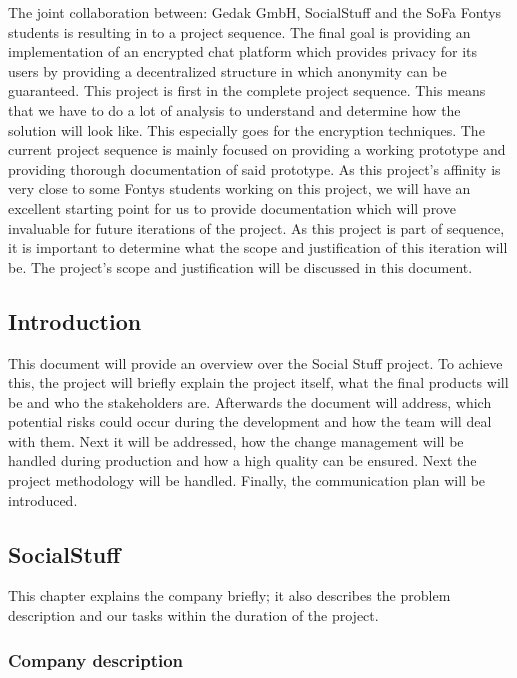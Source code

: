 The joint collaboration between: Gedak GmbH, SocialStuff and the SoFa Fontys students is resulting in to a project
sequence.
The final goal is providing an implementation of an encrypted chat platform which provides privacy for its users by
providing a decentralized structure in which anonymity can be guaranteed.
This project is first in the complete project sequence.
This means that we have to do a lot of analysis to understand and determine how the solution will look like.
This especially goes for the encryption techniques.
The current project sequence is mainly focused on providing a working prototype and providing thorough documentation
of said prototype.
As this project’s affinity is very close to some Fontys students working on this project, we will have an
excellent starting point for us to provide documentation which will prove invaluable for future iterations of the
project.
As this project is part of sequence, it is important to determine what the scope and justification of this iteration
will be.
The project's scope and justification will be discussed in this document.

\subsection{Introduction}\label{subsec:introduction}
This document will provide an overview over the Social Stuff project.
To achieve this, the project will briefly explain the project itself, what the final products will be and who the
stakeholders are.
Afterwards the document will address, which potential risks could occur during the development and how the team will
deal with them.
Next it will be addressed, how the change management will be handled during production and how a high quality can be
ensured.
Next the project methodology will be handled.
Finally, the communication plan will be introduced.

\subsection{SocialStuff}\label{subsec:socialstuff}

This chapter explains the company briefly;
it also describes the problem description and our tasks within the duration of the project.

\subsubsection{Company description}

